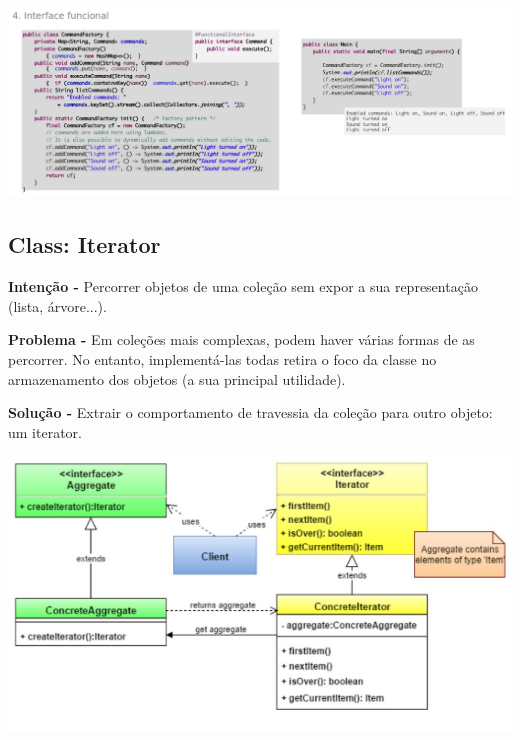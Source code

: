 \documentclass{article}
\begin{document}
\begin{center}
    \includegraphics[scale=0.35]{Images/62.png}
\end{center}

\subsection{Class: Iterator}

\begin{flushleft}
    \textbf{Intenção -} Percorrer objetos de uma coleção sem expor a sua representação (lista, árvore...).
\end{flushleft}    

\begin{flushleft}
    \textbf{Problema -} Em coleções mais complexas, podem haver várias formas de as percorrer. No
    entanto, implementá-las todas retira o foco da classe no armazenamento dos objetos
    (a sua principal utilidade).
\end{flushleft}

\begin{flushleft}
    \textbf{Solução -} Extrair o comportamento de travessia da coleção para outro objeto: um iterator.
\end{flushleft}
\vspace{4mm}
\begin{center}
    \includegraphics[scale=0.4]{Images/63.png}
\end{center}
\end{document}
